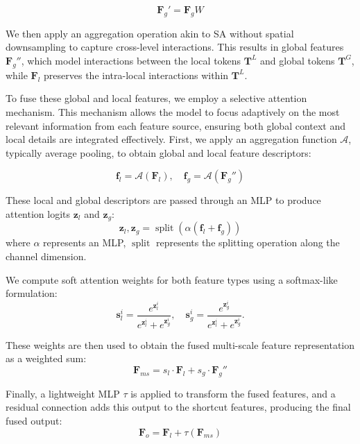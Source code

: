 \begin{equation}
	\mathbf{F}_g' = \mathbf{F}_g W
\end{equation}

We then apply an aggregation operation akin to SA without spatial downsampling to capture cross-level interactions. This results in global features $\mathbf{F}_g''$, which model interactions between the local tokens $\mathbf{T}^{L}$ and global tokens $\mathbf{T}^{G}$, while $\mathbf{F}_l$ preserves the intra-local interactions within $\mathbf{T}^{L}$.

To fuse these global and local features, we employ a selective attention mechanism. This mechanism allows the model to focus adaptively on the most relevant information from each feature source, ensuring both global context and local details are integrated effectively. First, we apply an aggregation function $\mathcal{A}$, typically average pooling, to obtain global and local feature descriptors:

\begin{equation}
	\mathbf{f}_l = \mathcal{A}(\mathbf{F}_l), \quad \mathbf{f}_g = \mathcal{A}(\mathbf{F}_g'')
\end{equation}

These local and global descriptors are passed through an MLP to produce attention logits $\mathbf{z}_l$ and $\mathbf{z}_g$:
\begin{equation}
	\mathbf{z}_l, \mathbf{z}_g = \operatorname{split}\left( \alpha \left( \mathbf{f}_l + \mathbf{f}_g \right) \right)
\end{equation}
where $\alpha$ represents an MLP, $\operatorname{split}$ represents the splitting operation along the channel dimension.

We compute soft attention weights for both feature types using a softmax-like formulation:
\begin{equation}
	\mathbf{s}_l^i = \frac{e^{\mathbf{z}_l^i}}{e^{\mathbf{z}_l^i} + e^{\mathbf{z}_g^i}}, \quad
\mathbf{s}_g^i = \frac{e^{\mathbf{z}_g^i}}{e^{\mathbf{z}_l^i} + e^{\mathbf{z}_g^i}}.
\end{equation}

These weights are then used to obtain the fused multi-scale feature representation as a weighted sum:
\begin{equation}
	\mathbf{F}_{ms} = s_l \cdot \mathbf{F}_l + s_g \cdot \mathbf{F}_g''
\end{equation}

Finally, a lightweight MLP $\tau$ is applied to transform the fused features, and a residual connection adds this output to the shortcut features, producing the final fused output:
\begin{equation}
	\mathbf{F}_o = \mathbf{F}_l + \tau(\mathbf{F}_{ms})
\end{equation}

